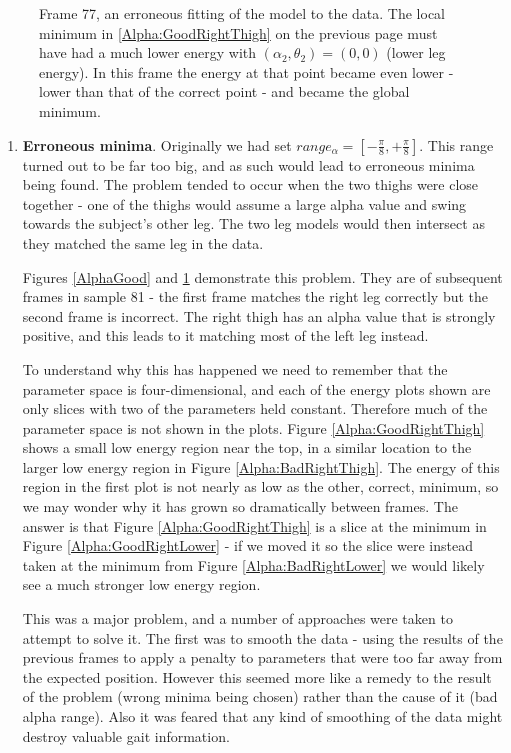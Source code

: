 \begin{figure}[p]
	\caption{Frame 77, an erroneous fitting of the model to the data.
		The local minimum in \ref{Alpha:GoodRightThigh} on the previous page must have had a much lower energy with $(\alpha_2, \theta_2) = (0, 0)$ (lower leg energy).
		In this frame the energy at that point became even lower - lower than that of the correct point - and became the global minimum.}
	\label{AlphaBad}
\end{figure}

\begin{enumerate}
	\item \textbf{Erroneous minima}.
		Originally we had set $range_\alpha = \left[ -\frac{\pi}{8}, +\frac{\pi}{8}\right]$.
		This range turned out to be far too big, and as such would lead to erroneous minima being found.
		The problem tended to occur when the two thighs were close together - one of the thighs would assume
		a large alpha value and swing towards the subject's other leg.
		The two leg models would then intersect as they matched the same leg in the data.
		
		Figures \ref{AlphaGood} and \ref{AlphaBad} demonstrate this problem.
		They are of subsequent frames in sample 81 - the first frame matches the right leg correctly
		but the second frame is incorrect.
		The right thigh has an alpha value that is strongly positive, and this leads to it matching most of the left leg instead.
		
		To understand why this has happened we need to remember that the parameter space is four-dimensional, and each of the energy plots
		shown are only slices with two of the parameters held constant.
		Therefore much of the parameter space is not shown in the plots.
		Figure \ref{Alpha:GoodRightThigh} shows a small low energy region near the top, in a similar location to the larger low energy region in Figure \ref{Alpha:BadRightThigh}.
		The energy of this region in the first plot is not nearly as low as the other, correct, minimum, so we may wonder why it has grown so dramatically between frames.
		The answer is that Figure \ref{Alpha:GoodRightThigh} is a slice at the minimum in Figure \ref{Alpha:GoodRightLower} - if we moved it so the slice
		were instead taken at the minimum from Figure \ref{Alpha:BadRightLower} we would likely see a much stronger low energy region.
		
		This was a major problem, and a number of approaches were taken to attempt to solve it.
		The first was to smooth the data - using the results of the previous frames to apply a penalty to parameters that were too far away from the expected position.
		However this seemed more like a remedy to the result of the problem (wrong minima being chosen) rather than the cause of it (bad alpha range).
		Also it was feared that any kind of smoothing of the data might destroy valuable gait information.
		

\end{enumerate}
